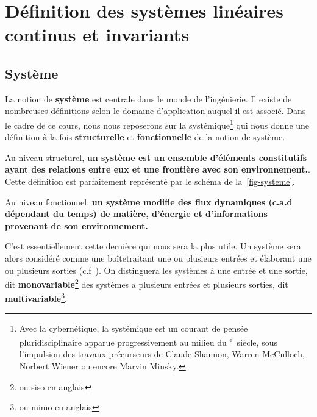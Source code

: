 \newpage
\section[Définition SLCI]
        {Définition des systèmes linéaires continus et invariants}

\subsection{Système}
La notion de \textbf{système} est centrale dans le monde de l'ingénierie.
Il existe de nombreuses définitions selon le domaine 
d'application auquel il est associé. Dans le cadre de ce cours, nous nous 
reposerons sur la systémique\footnote{Avec la cybernétique, la systémique est 
un courant de pensée pluridisciplinaire apparue progressivement au milieu du 
\textsc{}\textsuperscript{e}~siècle, sous l'impulsion des 
travaux précurseurs de Claude Shannon, 
Warren McCulloch, 
Norbert Wiener 
ou encore Marvin Minsky.} 
qui nous donne une définition à la fois \textbf{structurelle} et 
\textbf{fonctionnelle} de la notion de système.

Au niveau structurel, \textbf{un système est un ensemble 
d'éléments constitutifs ayant des relations entre eux et 
une frontière avec son environnement.}. Cette définition est parfaitement
représenté par le schéma de la~\cref{fig-systeme}.

Au niveau fonctionnel, \textbf{un système modifie des flux dynamiques 
(c.a.d dépendant du temps) de matière, d'énergie et d'informations provenant 
de son environnement.}

C'est essentiellement cette dernière qui nous sera la plus utile.
Un système sera alors considéré comme 
une \og boîte\fg traitant une ou plusieurs entrées et élaborant une ou 
plusieurs sorties (c.f~). On distinguera les systèmes à 
une entrée et une sortie, dit \textbf{monovariable}\footnote{ou \gls{siso} 
en anglais} des systèmes  a plusieurs entrées et plusieurs sorties, dit 
\textbf{multivariable}\footnote{ou \gls{mimo} en anglais}.

